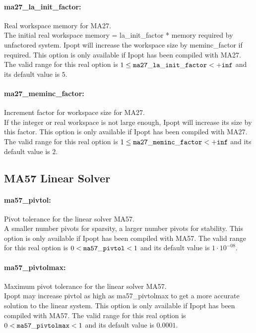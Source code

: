 \paragraph{ma27\_la\_init\_factor:}\label{opt:ma27_la_init_factor} Real workspace memory for MA27. \\
 The initial real workspace memory = la\_init\_factor * memory required by unfactored system. Ipopt will increase the workspace size by meminc\_factor if required.  This option is only available if  Ipopt has been compiled with MA27. The valid range for this real option is 
$1 \le {\tt ma27\_la\_init\_factor } <  {\tt +inf}$
and its default value is $5$.


\paragraph{ma27\_meminc\_factor:}\label{opt:ma27_meminc_factor} Increment factor for workspace size for MA27. \\
 If the integer or real workspace is not large enough, Ipopt will increase its size by this factor.  This option is only available if Ipopt has been compiled with MA27. The valid range for this real option is 
$1 \le {\tt ma27\_meminc\_factor } <  {\tt +inf}$
and its default value is $2$.


\subsection{MA57 Linear Solver}

\paragraph{ma57\_pivtol:}\label{opt:ma57_pivtol} Pivot tolerance for the linear solver MA57. \\
 A smaller number pivots for sparsity, a larger number pivots for stability. This option is only available if Ipopt has been compiled with MA57. The valid range for this real option is 
$0 <  {\tt ma57\_pivtol } <  1$
and its default value is $1 \cdot 10^{-08}$.


\paragraph{ma57\_pivtolmax:}\label{opt:ma57_pivtolmax} Maximum pivot tolerance for the linear solver MA57. \\
 Ipopt may increase pivtol as high as ma57\_pivtolmax to get a more accurate solution to the linear system.  This option is only available if Ipopt has been compiled with MA57. The valid range for this real option is 
$0 <  {\tt ma57\_pivtolmax } <  1$
and its default value is $0.0001$.



